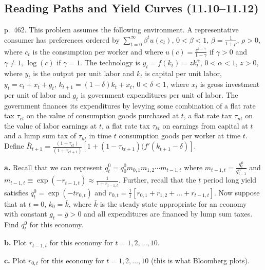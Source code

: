 \documentclass[12pt, letterpaper]{article}
\begin{document}
\subsection{Reading Paths and Yield Curves (11.10--11.12)}

\begin{tcolorbox}[evenbox,title={Exercise 11.10 \quad Term structure of interest rates}]
\begin{tcolorbox}[questionbox]
p.~462. This problem assumes the following environment. A representative consumer has preferences ordered by
$\sum_{t=0}^\infty\beta^tu(c_t)$, $0<\beta<1$, $\beta=\frac1{1+\rho}$, $\rho>0$, where $c_t$ is the consumption per worker
and where $u(c)=\frac{c^{1-\gamma}}{1-\gamma}$ if $\gamma>0$ and $\gamma\ne1$, $\log(c)$ if $\gamma=1$. The technology is
$y_t=f(k_t)=zk_t^\alpha$, $0<\alpha<1$, $z>0$, where $y_t$ is the output per unit labor and $k_t$ is capital per unit labor,
$y_t=c_t+x_t+g_t$, $k_{t+1}=(1-\delta)k_t+x_t$, $0<\delta<1$, where $x_t$ is gross investment per unit of labor and $g_t$
is government expenditures per unit of labor. The government finances its expenditures by levying some combination of a
flat rate tax $\tau_{ct}$ on the value of consumption goods purchased at $t$, a flat rate tax $\tau_{nt}$ on the value of
labor earnings at $t$, a flat rate tax $\tau_{kt}$ on earnings from capital at $t$ and a lump sum tax of $\tau_{ht}$ in time
$t$ consumption goods per worker at time $t$. Define
$\bar R_{t+1}=\frac{(1+\tau_{ct})}{(1+\tau_{ct+1})}\left[1+(1-\tau_{kt+1})(f'(k_{t+1}-\delta)\right]$.

\textbf{a.} Recall that we can represent $q^0_t=q^0_0m_{0,1}m_{1,2}\cdots m_{t-1,t}$ where
$m_{t-1,t}=\frac{q^0_t}{q^0_{t-1}}$ and $m_{t-1,t}\equiv\exp(-r_{t-1,t})\approx\frac1{1+r_{t-1,t}}$. Further, recall that
the $t$ period long yield satisfies $q^0_t=\exp(-tr_{0,t})$ and $r_{0,t}=\frac1t[r_{0,1}+r_{1,2}+\dots+r_{t-1,t}]$. Now
suppose that at $t=0$, $k_0=\bar k$, where $\bar k$ is the steady state appropriate for an economy with constant
$g_t=\bar g>0$ and all expenditures are financed by lump sum taxes. Find $q^0_t$ for this economy.

\textbf{b.} Plot $r_{t-1,t}$ for this economy for $t=1,2,\dots,10$.

\textbf{c.} Plot $r_{0,t}$ for this economy for $t=1,2,\dots,10$ (this is what Bloomberg plots).


\end{tcolorbox}
\end{tcolorbox}
\end{document}
